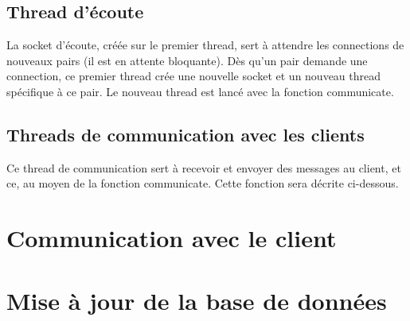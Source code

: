 \subsection{Thread d'écoute}
La socket d'écoute, créée sur le premier thread, sert à attendre les connections de nouveaux pairs (il est en attente bloquante). Dès qu'un pair demande une connection, ce premier thread crée une nouvelle socket et un nouveau thread spécifique à ce pair.
Le nouveau thread est lancé avec la fonction communicate.
\subsection{Threads de communication avec les clients}
Ce thread de communication sert à recevoir et envoyer des messages au client, et ce, au moyen de la fonction communicate. Cette fonction sera décrite ci-dessous.


\section{Communication avec le client}


\section{Mise à jour de la base de données}

